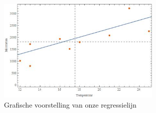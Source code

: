\documentclass[11pt]{report}
\begin{document}
\begin{figure}[H]
  \centering
  \includegraphics[width=0.7\textwidth]{RegressieCafeScatterplotRegressionLine.jpg}
  \caption{Grafische voorstelling van onze regressielijn}
\end{figure}



\printbibliography
\end{document}
